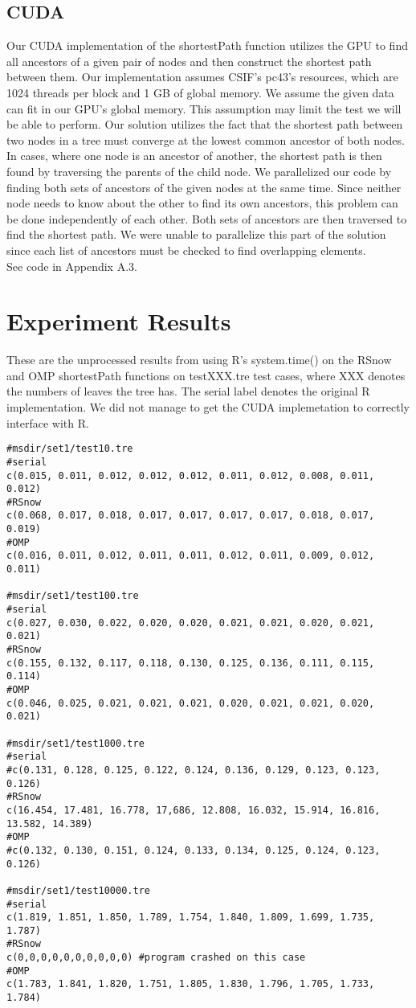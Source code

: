 \documentclass[11pt,letterpaper]{article}
\begin{document}
\subsection{CUDA}
Our CUDA implementation of the shortestPath function utilizes the GPU to find all ancestors of a given pair of nodes and then construct the shortest path between them. 
Our implementation assumes CSIF's pc43's resources, which are 1024 threads per block and 1 GB of global memory. We assume the given data can fit in our GPU’s global memory. 
This assumption may limit the test we will be able to perform. 
Our solution utilizes the fact that the shortest path between two nodes in a tree must converge at the lowest common ancestor of both nodes. 
In cases, where one node is an ancestor of another, the shortest path is then found by traversing the parents of the child node. 
We parallelized our code by finding both sets of ancestors of the given nodes at the same time. 
Since neither node needs to know about the other to find its own ancestors, this problem can be done independently of each other. 
Both sets of ancestors are then traversed to find the shortest path. 
We were unable to parallelize this part of the solution since each list of ancestors must be checked to find overlapping elements. \\

See code in Appendix A.3.\\

\section{Experiment Results}

These are the unprocessed results from using R's system.time() on the RSnow and OMP shortestPath functions on testXXX.tre test cases, where XXX denotes the numbers of leaves the tree has. The serial label denotes the original R implementation. We did not manage to get the CUDA implemetation to correctly interface with R.
\begin{verbatim}
#msdir/set1/test10.tre
#serial 
c(0.015, 0.011, 0.012, 0.012, 0.012, 0.011, 0.012, 0.008, 0.011, 0.012)
#RSnow
c(0.068, 0.017, 0.018, 0.017, 0.017, 0.017, 0.017, 0.018, 0.017, 0.019)
#OMP
c(0.016, 0.011, 0.012, 0.011, 0.011, 0.012, 0.011, 0.009, 0.012, 0.011)

#msdir/set1/test100.tre
#serial
c(0.027, 0.030, 0.022, 0.020, 0.020, 0.021, 0.021, 0.020, 0.021, 0.021)
#RSnow
c(0.155, 0.132, 0.117, 0.118, 0.130, 0.125, 0.136, 0.111, 0.115, 0.114)
#OMP
c(0.046, 0.025, 0.021, 0.021, 0.021, 0.020, 0.021, 0.021, 0.020, 0.021)

#msdir/set1/test1000.tre
#serial
#c(0.131, 0.128, 0.125, 0.122, 0.124, 0.136, 0.129, 0.123, 0.123, 0.126)
#RSnow
c(16.454, 17.481, 16.778, 17,686, 12.808, 16.032, 15.914, 16.816, 13.582, 14.389)
#OMP 
#c(0.132, 0.130, 0.151, 0.124, 0.133, 0.134, 0.125, 0.124, 0.123, 0.126)

#msdir/set1/test10000.tre
#serial
c(1.819, 1.851, 1.850, 1.789, 1.754, 1.840, 1.809, 1.699, 1.735, 1.787)
#RSnow
c(0,0,0,0,0,0,0,0,0,0) #program crashed on this case
#OMP
c(1.783, 1.841, 1.820, 1.751, 1.805, 1.830, 1.796, 1.705, 1.733, 1.784)
\end{verbatim}
\end{document}
